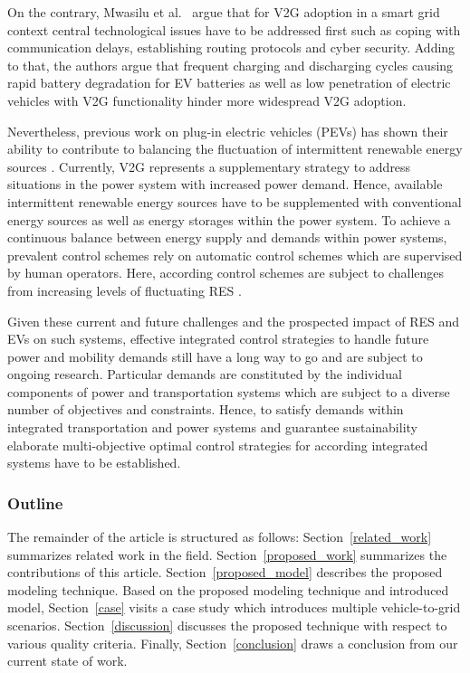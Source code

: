 On the contrary, Mwasilu et al.~\cite{mwasilu2014electric} argue that for V2G adoption in a smart grid context central technological issues have to be addressed first such as coping with communication delays, establishing routing protocols and cyber security. Adding to that, the authors argue that frequent charging and discharging cycles causing rapid battery degradation for EV batteries as well as low penetration of electric vehicles with V2G functionality hinder more widespread V2G adoption.


Nevertheless, previous work on plug-in electric vehicles (PEVs) has shown their ability to contribute to balancing the fluctuation of intermittent renewable energy sources \cite{dallinger2012grid}. Currently, V2G represents a supplementary strategy to address situations in the power system with increased power demand. Hence, available intermittent renewable energy sources have to be supplemented with conventional energy sources as well as energy storages within the power system. To achieve a continuous balance between energy supply and demands within power systems, prevalent control schemes rely on automatic control schemes which are supervised by human operators. Here, according control schemes are subject to challenges from increasing levels of fluctuating RES \cite{heussen2012unified}.



Given these current and future challenges and the prospected impact of RES and EVs on such systems, effective integrated control strategies to handle future power and mobility demands still have a long way to go and are subject to ongoing research. Particular demands are constituted by the individual components of power and transportation systems which are subject to a diverse number of objectives and constraints. Hence, to satisfy demands within integrated transportation and power systems and guarantee sustainability elaborate multi-objective optimal control strategies for according integrated systems have to be established.

\subsubsection*{Outline}

The remainder of the article is structured as follows: Section~\ref{related_work} summarizes related work in the field. Section~\ref{proposed_work} summarizes the contributions of this article. Section~\ref{proposed_model} describes the proposed modeling technique. Based on the proposed modeling technique and introduced model, Section~\ref{case} visits a case study which introduces multiple vehicle-to-grid scenarios. Section~\ref{discussion} discusses the proposed technique with respect to various quality criteria. Finally, Section~\ref{conclusion} draws a conclusion from our current state of work.